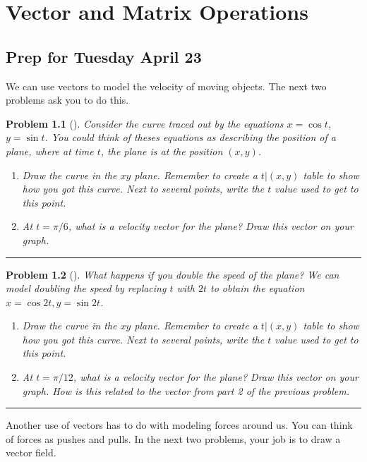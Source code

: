\documentclass[letterpaper,oneside]{book}%
\theoremstyle{plain}
\theoremstyle{box}
\theoremstyle{problem}
\newtheorem{problemnum}{Problem}[chapter]
\newenvironment{problem}[1][]{\begin{problemnum}[#1]}{\end{problemnum}\nopagebreak\hrule\bigskip}
\begin{document}
\mainmatter

\chapter{Vector and Matrix Operations}

\section{Prep for Tuesday April 23}

We can use vectors to model the velocity of moving objects.  The next two problems ask you to do this.

\begin{problem}
 Consider the curve traced out by the equations $x=\cos t$, $y=\sin t$. You could think of theses equations as describing the position of a plane, where at time $t$, the plane is at the position $(x,y)$.  
\begin{enumerate}
 \item Draw the curve in the $xy$ plane.  Remember to create a $t|(x,y)$ table to show how you got this curve. Next to several points, write the $t$ value used to get to this point. 
 \item At $t=\pi/6$, what is a velocity vector for the plane?  Draw this vector on your graph. 
\end{enumerate}
\end{problem}

\begin{problem}
 What happens if you double the speed of the plane?  We can model doubling the speed by replacing $t$ with $2t$ to obtain the equation $x=\cos 2t, y=\sin 2t$.
\begin{enumerate}
 \item Draw the curve in the $xy$ plane.  Remember to create a $t|(x,y)$ table to show how you got this curve. Next to several points, write the $t$ value used to get to this point. 
 \item At $t=\pi/12$, what is a velocity vector for the plane?  Draw this vector on your graph. How is this related to the vector from part 2 of the previous problem.
\end{enumerate}

\end{problem}


Another use of vectors has to do with modeling forces around us. You can think of forces as pushes and pulls. In the next two problems, your job is to draw a vector field. 
\end{document}
